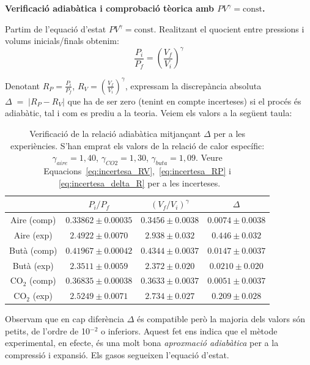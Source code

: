 \documentclass[a4paper,twoside,12pt]{article}
\theoremstyle{definition}
\begin{document}
	\textbf{Verificació adiabàtica i comprobació tèorica amb $PV^{\gamma}=\mathrm{const}$.}
	
	Partim de l'equació d'estat $PV^{\gamma}=\mathrm{const}$. Realitzant el quocient entre pressions i volums inicials/finals obtenim:
	$$\frac{P_i}{P_f}=\left(\frac{V_f}{V_i}\right)^{\gamma}$$
	
	Denotant $R_P=\frac{P_i}{P_f}$, $R_V=\left(\frac{V_f}{V_i}\right)^{\gamma}$, expressam la discrepància absoluta $\Delta \;=\; |R_P - R_V|$ que ha de ser zero (tenint en compte incerteses) si el procés és adiabàtic, tal i com es prediu a la teoria. Veiem els valors a la següent taula:
	
	\begin{table}[h]
		\centering
		\caption{Verificació de la relació adiabàtica mitjançant $\Delta$ per a les experiències. S'han emprat els valors de la relació de calor específic: $\gamma_{aire} =1,40$, $\gamma_{CO2}=1,30$, $\gamma_{buta}=1,09$. Veure Equacions~\ref{eq:incertesa_RV},~\ref{eq:incertesa_RP} i ~\ref{eq:incertesa_delta_R} per a les incerteses.}
		\begin{tabular}{|c|ccc|}
			\hline
			 & $P_i/P_f$ & $(V_f/V_i)^{\gamma}$ & $\Delta$ \\
			\hline
			Aire (comp) & $0.33862 \pm 0.00035$ & $0.3456 \pm 0.0038$ & $0.0074 \pm 0.0038$ \\
			Aire (exp)  & $2.4922 \pm 0.0070$ & $2.938 \pm 0.032$ & $0.446 \pm 0.032$ \\ \hline
			Butà (comp) & $0.41967 \pm 0.00042$ & $0.4344 \pm 0.0037$ & $0.0147 \pm 0.0037$ \\
			Butà (exp)  & $2.3511 \pm 0.0059$ & $2.372 \pm 0.020$ & $0.0210 \pm 0.020$ \\ \hline
			CO$_2$ (comp) & $0.36835 \pm 0.00038$ & $0.3633 \pm 0.0037$ & $0.0051\pm 0.0037$ \\
			CO$_2$ (exp)  & $2.5249 \pm 0.0071$ & $2.734 \pm 0.027$ & $0.209 \pm 0.028$ \\
			\hline
		\end{tabular}
		\label{tab:adiabatic_ratios_delta}
	\end{table}

	
 Observam que en cap diferència $\Delta$ és compatible però la majoria dels valors són petits, de l'ordre de 10$^{-2}$ o inferiors. Aquest fet ens indica que el mètode experimental, en efecte, és una molt bona \textit{aproxmació adiabàtica} per a la compressió i expansió. Els gasos segueixen l'equació d'estat. 
	
	
	
\end{document}
